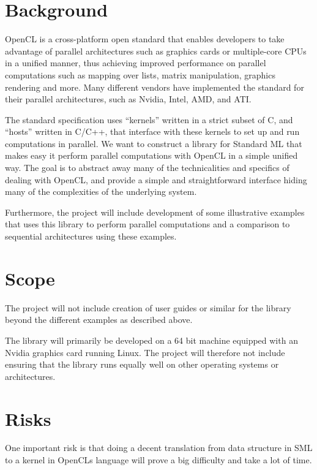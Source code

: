 \documentclass[a4paper, 10pt]{article}
\begin{document}
\section{Background}

OpenCL is a cross-platform open standard that enables developers to
take advantage of parallel architectures such as graphics cards or
multiple-core CPUs in a unified manner, thus achieving improved
performance on parallel computations such as mapping over lists,
matrix manipulation, graphics rendering and more. Many different
vendors have implemented the standard for their parallel architectures,
such as Nvidia, Intel, AMD, and ATI.

The standard specification uses ``kernels'' written in a strict subset
of C, and ``hosts'' written in C/C++, that interface
with these kernels to set up and run computations in parallel. We
want to construct a library for Standard ML that makes easy it perform
parallel computations with OpenCL in a simple unified way. The goal is
to abstract away many of the technicalities and specifics of dealing
with OpenCL, and provide a simple and straightforward interface hiding
many of the complexities of the underlying system.

Furthermore, the project will include development of some illustrative
examples that uses this library to perform parallel computations and a
comparison to sequential architectures using these examples.

\section{Scope}

The project will not include creation of user guides or similar for
the library beyond the different examples as described above.

The library will primarily be developed on a 64 bit machine equipped
with an Nvidia graphics card running Linux. The project will therefore
not include ensuring that the library runs equally well on other
operating systems or architectures.

\section{Risks}

One important risk is that doing a decent translation from data
structure in SML to a kernel in OpenCLs language will prove a big
difficulty and take a lot of time.
\end{document}
